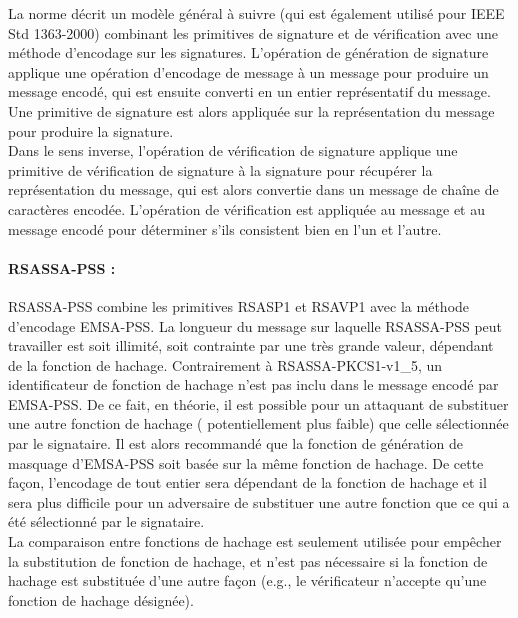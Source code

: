La norme décrit un modèle général à suivre (qui est également utilisé pour IEEE Std 1363-2000) combinant les primitives de signature et de vérification avec une méthode d'encodage sur les signatures. L'opération de génération de signature applique une opération d'encodage de message à un message pour produire un message encodé, qui est ensuite converti en un entier représentatif du message. Une primitive de signature est alors appliquée sur la représentation du message pour produire la signature.\\ 


Dans le sens inverse, l'opération de vérification de signature applique une primitive de vérification de signature à la signature pour récupérer la représentation du message, qui est alors convertie dans un message de chaîne de caractères encodée. L'opération de vérification est appliquée au message et au message encodé pour déterminer s'ils  consistent bien en  l'un et l'autre.\\ 


\paragraph{RSASSA-PSS : \\}
RSASSA-PSS combine les primitives RSASP1 et RSAVP1 avec la méthode d'encodage EMSA-PSS. La longueur du message sur laquelle RSASSA-PSS peut travailler est soit illimité, soit contrainte par une très grande valeur, dépendant de la fonction de hachage. Contrairement à RSASSA-PKCS1-v1\_5, un identificateur de fonction de hachage n'est pas inclu dans le message encodé par EMSA-PSS. De ce fait, en théorie, il est possible pour un attaquant de substituer une autre fonction de hachage ( potentiellement plus faible) que celle sélectionnée par le signataire. Il est alors recommandé que la fonction de génération de masquage d'EMSA-PSS  soit basée sur la même fonction de hachage. De cette façon, l'encodage de tout entier sera dépendant de la fonction de hachage et il sera plus difficile pour un adversaire de substituer une autre fonction que ce qui a été sélectionné par le signataire.\\


La comparaison entre fonctions de hachage est seulement utilisée pour empêcher la substitution de fonction de hachage, et n'est pas nécessaire si la fonction de hachage est substituée d'une autre façon (e.g., le vérificateur n'accepte qu'une fonction de hachage désignée).\\ 


